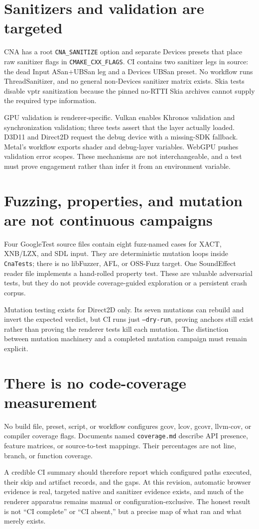 \section{Sanitizers and validation are targeted}

CNA has a root \texttt{CNA\_SANITIZE} option and separate Devices presets that place raw sanitizer
flags in \texttt{CMAKE\_CXX\_FLAGS}.  CI contains two sanitizer legs in source: the dead Input
ASan+UBSan leg and a Devices UBSan preset.  No workflow runs ThreadSanitizer, and no general
non-Devices sanitizer matrix exists.  Skia tests disable vptr sanitization because the pinned
no-RTTI Skia archives cannot supply the required type information.

GPU validation is renderer-specific.  Vulkan enables Khronos validation and synchronization
validation; three tests assert that the layer actually loaded.  D3D11 and Direct2D request the
debug device with a missing-SDK fallback.  Metal's workflow exports shader and debug-layer
variables.  WebGPU pushes validation error scopes.  These mechanisms are not interchangeable,
and a test must prove engagement rather than infer it from an environment variable.

\section{Fuzzing, properties, and mutation are not continuous campaigns}

Four GoogleTest source files contain eight fuzz-named cases for XACT, XNB/LZX, and SDL input.
They are deterministic mutation loops inside \texttt{CnaTests}; there is no libFuzzer, AFL, or
OSS-Fuzz target.  One SoundEffect reader file implements a hand-rolled property test.  These are
valuable adversarial tests, but they do not provide coverage-guided exploration or a persistent
crash corpus.

Mutation testing exists for Direct2D only.  Its seven mutations can rebuild and invert the
expected verdict, but CI runs just \texttt{--dry-run}, proving anchors still exist rather than
proving the renderer tests kill each mutation.  The distinction between mutation machinery and a
completed mutation campaign must remain explicit.

\section{There is no code-coverage measurement}

No build file, preset, script, or workflow configures gcov, lcov, gcovr, llvm-cov, or compiler
coverage flags.  Documents named \texttt{coverage.md} describe API presence, feature matrices, or
source-to-test mappings.  Their percentages are not line, branch, or function coverage.

A credible CI summary should therefore report which configured paths executed, their skip and
artifact records, and the gaps.  At this revision, automatic browser evidence is real, targeted
native and sanitizer evidence exists, and much of the renderer apparatus remains manual or
configuration-exclusive.  The honest result is not ``CI complete'' or ``CI absent,'' but a
precise map of what ran and what merely exists.
